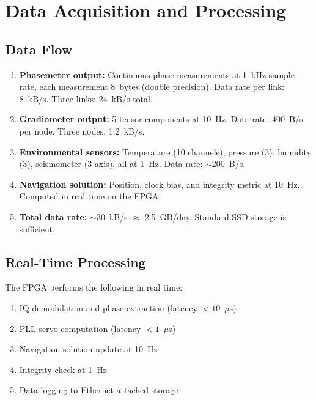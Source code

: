 \documentclass[12pt,letterpaper]{article}
\begin{document}
\section{Data Acquisition and Processing}

\subsection{Data Flow}

\begin{enumerate}
\item \textbf{Phasemeter output:} Continuous phase measurements at 1~kHz
sample rate, each measurement 8~bytes (double precision). Data rate per
link: 8~kB/s. Three links: 24~kB/s total.

\item \textbf{Gradiometer output:} 5 tensor components at 10~Hz.
Data rate: 400~B/s per node. Three nodes: 1.2~kB/s.

\item \textbf{Environmental sensors:} Temperature (10 channels),
pressure (3), humidity (3), seismometer (3-axis), all at 1~Hz.
Data rate: $\sim$200~B/s.

\item \textbf{Navigation solution:} Position, clock bias, and integrity
metric at 10~Hz. Computed in real time on the FPGA.

\item \textbf{Total data rate:} $\sim$30~kB/s $\approx$ 2.5~GB/day.
Standard SSD storage is sufficient.
\end{enumerate}

\subsection{Real-Time Processing}

The FPGA performs the following in real time:
\begin{enumerate}
\item IQ demodulation and phase extraction (latency $< 10$~$\mu$s)
\item PLL servo computation (latency $< 1$~$\mu$s)
\item Navigation solution update at 10~Hz
\item Integrity check at 1~Hz
\item Data logging to Ethernet-attached storage
\end{enumerate}
\end{document}
